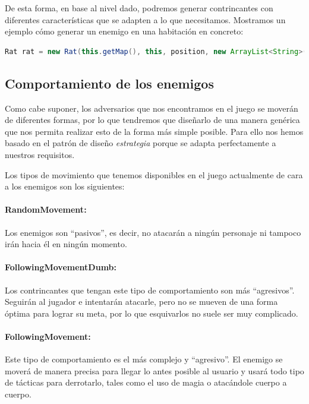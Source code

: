 De esta forma, en base al nivel dado, podremos generar contrincantes con diferentes características que se adapten a lo que necesitamos. Mostramos un ejemplo cómo generar un enemigo en una habitación en concreto:

\begin{lstlisting}[language=java]
Rat rat = new Rat(this.getMap(), this, position, new ArrayList<String>(), level);
\end{lstlisting}

\subsection{Comportamiento de los enemigos}
\label{sec:ia}

Como cabe suponer, los adversarios que nos encontramos en el juego se moverán de diferentes formas, por lo que tendremos que diseñarlo de una manera genérica que nos permita realizar esto de la forma más simple posible.
Para ello nos hemos basado en el patrón de diseño \textit{estrategia} porque se adapta perfectamente a nuestros requisitos.

Los tipos de movimiento que tenemos disponibles en el juego actualmente de cara a los enemigos son los siguientes:

\paragraph{RandomMovement:} Los enemigos son ``pasivos'', es decir, no atacarán a ningún personaje ni tampoco irán hacia él en ningún momento.

\paragraph{FollowingMovementDumb:} Los contrincantes que tengan este tipo de comportamiento son más ``agresivos''. Seguirán al jugador e intentarán atacarle, pero no se mueven de una forma óptima para lograr su meta, por lo que esquivarlos no suele ser muy complicado.

\paragraph{FollowingMovement:} Este tipo de comportamiento es el más complejo y ``agresivo''. El enemigo se moverá de manera precisa para llegar lo antes posible al usuario y usará todo tipo de tácticas para derrotarlo, tales como el uso de magia o atacándole cuerpo a cuerpo.


